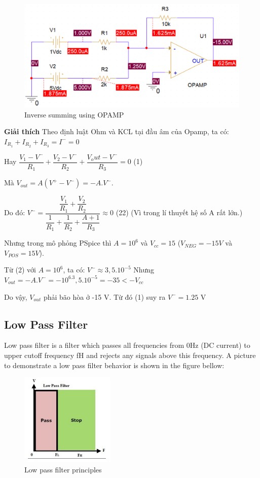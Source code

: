 \begin{figure}[ht]
    \centering
    \includegraphics[width=1\textwidth]{graphics/ex1/f13.png}
    \caption{Inverse summing using OPAMP}
\end{figure}

\textbf{Giải thích}
Theo định luật Ohm và KCL tại đầu âm của Opamp, ta có: $I_{R_1} + I_{R_2} + I_{R_3} = I^- = 0$

Hay $\dfrac{V_1 - V^-}{R_1} + \dfrac{V_2 - V^-}{R_2} + \dfrac{V_out - V^-}{R_3} = 0$ (1)

Mà $V_{out} = A(V^+ - V^-) = -A.V^-$.

Do đó: $V^- = \dfrac{\dfrac{V_1}{R_1} + \dfrac{V_2}{R_2}}{\dfrac{1}{R_1}+ \dfrac{1}{R_2} + \dfrac{A+1}{R_3}} \approx 0$ (22) (Vì trong lí thuyết hệ số A rất lớn.)

Nhưng trong mô phỏng PSpice thì $A = 10^6$ và $V_{cc} = 15$ ($V_{NEG} = -15V$ và $V_{POS} = 15 V$). 

Từ (2) với $A = 10^6$, ta có: $V^- \approx 3,5.10^{-5}$ Nhưng $V_{out} = -A.V^- = -10^6.3,5.10^{-5} = -35 < -V_{cc}$

Do vậy, $V_{out}$ phải bão hòa ở -15 V. Từ đó (1) suy ra $V^- = 1.25$ V
\pagebreak

\subsection{Low Pass Filter}

Low pass filter is a filter which passes all frequencies from 0Hz (DC current) to upper cutoff frequency fH and rejects any signals above this frequency. A picture to demonstrate a
low pass filter behavior is shown in the figure bellow:

\begin{figure}[ht]
    \centering
    \includegraphics[width=0.4\textwidth]{graphics/ex1/f14.png}
    \caption{Low pass filter principles}
\end{figure}

